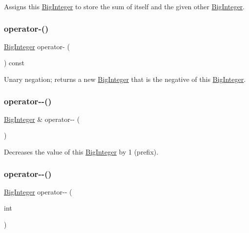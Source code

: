 Assigns this \mbox{\hyperlink{classBigInteger}{Big\+Integer}} to store the sum of itself and the given other \mbox{\hyperlink{classBigInteger}{Big\+Integer}}. 

\mbox{\label{classBigInteger_afdae548140cb672a33a3c6bf402ea613}} 
\subsubsection{\texorpdfstring{operator-\/()}{operator-()}}
{\footnotesize\ttfamily \mbox{\hyperlink{classBigInteger}{Big\+Integer}} operator-\/ (\begin{DoxyParamCaption}{ }\end{DoxyParamCaption}) const}



Unary negation; returns a new \mbox{\hyperlink{classBigInteger}{Big\+Integer}} that is the negative of this \mbox{\hyperlink{classBigInteger}{Big\+Integer}}. 

\mbox{\label{classBigInteger_a8cc5faea7f6f011fbba6cbf31d55a1dd}} 
\subsubsection{\texorpdfstring{operator-\/-\/()}{operator--()}\hspace{0.1cm}{\footnotesize\ttfamily [1/2]}}
{\footnotesize\ttfamily \mbox{\hyperlink{classBigInteger}{Big\+Integer}} \& operator-\/-\/ (\begin{DoxyParamCaption}{ }\end{DoxyParamCaption})}



Decreases the value of this \mbox{\hyperlink{classBigInteger}{Big\+Integer}} by 1 (prefix). 

\mbox{\label{classBigInteger_ac74beb1a11a5ad6ab210b8c9101451c8}} 
\subsubsection{\texorpdfstring{operator-\/-\/()}{operator--()}\hspace{0.1cm}{\footnotesize\ttfamily [2/2]}}
{\footnotesize\ttfamily \mbox{\hyperlink{classBigInteger}{Big\+Integer}} operator-\/-\/ (\begin{DoxyParamCaption}\item[{int}]{ }\end{DoxyParamCaption})}



